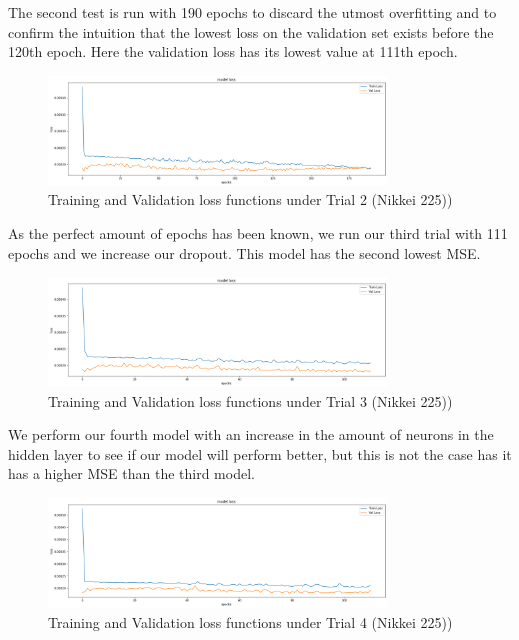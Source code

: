 \documentclass[a4paper,11pt,oneside]{book}
\begin{document}
 The second test is run with 190 epochs to discard the utmost overfitting and to confirm the intuition that the lowest loss on the validation set exists
 before the 120th epoch. Here the validation loss has its lowest value at 111th epoch. 
\begin{figure}[!h]
	\centering
	\includegraphics[width=0.8\textwidth]{figures/Nik2}
	\caption{Training and Validation loss functions under Trial 2 (Nikkei 225))}
	\label{Nik2}
\end{figure}

As the perfect amount of epochs has been known, we run our third trial with 111 epochs and we increase our dropout. This model has the second lowest MSE. 
\newpage
\begin{figure}[!h]
	\centering
	\includegraphics[width=0.8\textwidth]{figures/Nik3}
	\caption{Training and Validation loss functions under Trial 3 (Nikkei 225))}
	\label{Nik3}
\end{figure}
We perform our fourth model with an increase in the amount of neurons in the hidden layer to see if our model will perform better, but this is not the case has it has a higher MSE than the third model.
\newline
\begin{figure}[!h]
	\centering
	\includegraphics[width=0.8\textwidth]{figures/Nik4}
	\caption{Training and Validation loss functions under Trial 4 (Nikkei 225))}
	\label{Nik4}
\end{figure}
\end{document}
